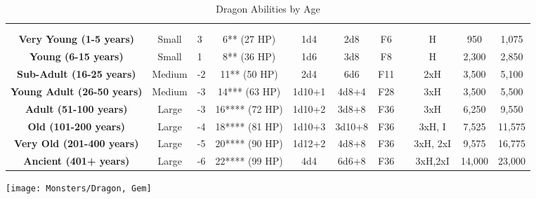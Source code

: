\begin {table}[H]
  \caption{Dragon Abilities by Age}\label{tab:Dragon Abilities by Age}
	\begin{tabularx}{\columnwidth}{>{\bfseries}ccYccccM{.8in}ccc}
	\thead{} &  \thead{} &  \thead{} &  \thead{} &  & \thead{} & \thead{} & \thead{}  & \\
	 &  &  &  &  &  &  &  &  &  & \\
	Very Young (1-5 years) & Small & 3 & 6** (27 HP) & 1d4 & 2d8 & F6 &  & H & 950 & 1,075\\
	Young (6-15 years) & Small & 1 & 8** (36 HP) & 1d6 & 3d8 & F8 &  & H & 2,300 & 2,850\\
	Sub-Adult (16-25 years) & Medium & -2 & 11** (50 HP) & 2d4 & 6d6 & F11 &  & 2xH & 3,500 & 5,100\\
	Young Adult (26-50 years) & Medium & -3 & 14*** (63 HP) & 1d10+1 & 4d8+4 & F28 &  & 3xH & 3,500 & 5,500\\
	Adult (51-100 years) & Large & -3 & 16**** (72 HP) & 1d10+2 & 3d8+8 & F36 &  & 3xH & 6,250 & 9,550\\
	Old (101-200 years) & Large & -4 & 18**** (81 HP) & 1d10+3 & 3d10+8 & F36 &  & 3xH, I & 7,525 & 11,575\\
	Very Old (201-400 years) & Large & -5 & 20**** (90 HP) & 1d12+2 & 4d8+8 & F36 &  & 3xH, 2xI & 9,575 & 16,775\\
	Ancient (401+ years) & Large & -6 & 22**** (99 HP) & 4d4 & 6d6+8 & F36 &  & 3xH,2xI & 14,000 & 23,000
  \end {tabularx}
\end {table}

\texttt{[image: Monsters/Dragon, Gem]}

